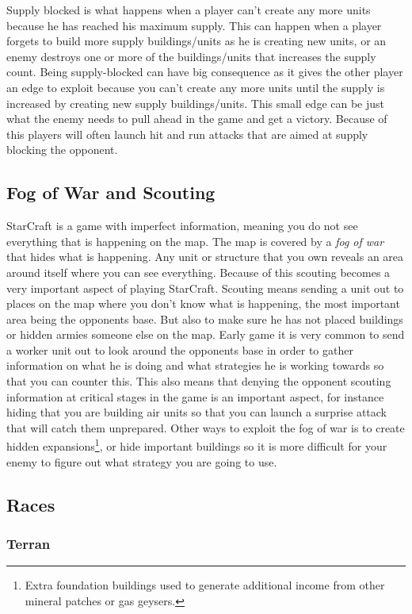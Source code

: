 Supply blocked is what happens when a player can't create any more units because
he has reached his maximum supply. This can happen when a player forgets to
build more supply buildings/units as he is creating new units, or an enemy
destroys one or more of the buildings/units that increases the supply count.
Being supply-blocked can have big consequence as it gives the other player an
edge to exploit because you can't create any more units until the supply is
increased by creating new supply buildings/units. This small edge can be just
what the enemy needs to pull ahead in the game and get a victory. Because of
this players will often launch hit and run attacks that are aimed at supply
blocking the opponent.
 
\subsection{Fog of War and Scouting}
StarCraft is a game with imperfect information, meaning you do not see
everything that is happening on the map. The map is covered by a \textit{fog
of war} that hides what is happening. Any unit or structure that you own reveals
an area around itself where you can see everything. Because of this scouting
becomes a very important aspect of playing StarCraft. Scouting means sending a
unit out to places on the map where you don't know what is happening, the most
important area being the opponents base. But also to make sure he has not placed
buildings or hidden armies someone else on the map. Early game it is very common
to send a worker unit out to look around the opponents base in order to gather
information on what he is doing and what strategies he is working towards so
that you can counter this. This also means that denying the opponent scouting
information at critical stages in the game is an important aspect, for instance
hiding that you are building air units so that you can launch a surprise attack
that will catch them unprepared. Other ways to exploit the fog of war is to
create hidden expansions\footnote{Extra foundation buildings used to generate
additional income from other mineral patches or gas geysers.}, or hide important
buildings so it is more difficult for your enemy to figure out what strategy you
are going to use. 

\subsection{Races}

\subsubsection{Terran}

